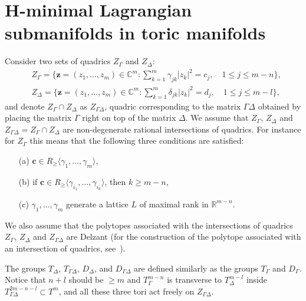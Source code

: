 \documentclass[jsg]{IP_v1_forauthors}
\def\ge{\geqslant}
\def\geq{\geqslant}
\def\leq{\leqslant}
\theoremstyle{definition}
\numberwithin{equation}{section}
\begin{document}
\section{H-minimal Lagrangian submanifolds in toric manifolds}

Consider two sets of quadrics $Z_\Gamma$ and $Z_\Delta$:
\begin{align}
&Z_\Gamma= \{\boldsymbol{z}=(z_1,\dots,z_m) \in {\mathbb C}^m \colon \sum_{k=1}^m \gamma_{jk}|z_k|^2= c_j,  \quad 1\leq j \leq m-n  \}, \\
&Z_\Delta=  \{\boldsymbol{z}=(z_1,\dots,z_m) \in {\mathbb C}^m \colon \sum_{k=1}^m \delta_{jk}|z_k|^2= d_j,  \quad 1\leq j \leq m-l \},
\end{align}
and denote $Z_\Gamma \cap Z_\Delta$ as $Z_{\Gamma \Delta}$, quadric corresponding to the matrix $\Gamma \Delta$ obtained by placing the matrix $\Gamma$ right on top of the matrix $\Delta$. We assume that  $Z_\Gamma$, $Z_\Delta$ and $Z_{\Gamma \Delta}=Z_\Gamma \cap Z_\Delta$ are non-degenerate rational intersections of quadrics. For instance for $Z_\Gamma$ this means that the following three conditions are satisfied:

\begin{itemize}

\item[(a)] $\boldsymbol{c} \in R_{\ge} \langle \gamma_1,\ldots,\gamma_m \rangle$,

\item[(b)] if $\boldsymbol{c} \in R_{\ge} \langle \gamma_{i_1},\ldots,\gamma_{i_k} \rangle$, then $k\geq m-n$,

\item[(c)] $\gamma_1,\ldots,\gamma_m$ generate a lattice $L$ of maximal rank in ${\mathbb R}^{m-n}$.
\end{itemize}

\noindent We also assume that the polytopes associated with the intersections of quadrics  $Z_\Gamma$, $Z_\Delta$ and $Z_{\Gamma \Delta}$ are Delzant (for the construction of the polytope associated with an intersection of quadrics, see~\cite{MP}).

The groups $T_\Delta$, $T_{\Gamma \Delta}$, $D_\Delta$, and $D_{\Gamma \Delta}$ are defined similarly as the groups $T_\Gamma$ and $D_\Gamma$. Notice that $n+l$ should be $\ge m$ and $T_\Gamma^{m-n}$ is transverse to $T_\Delta^{m-l}$ inside $T_{\Gamma \Delta}^{2m-n-l} \subset T^m$, and all these three tori act freely on $Z_{\Gamma \Delta}$.
\end{document}
